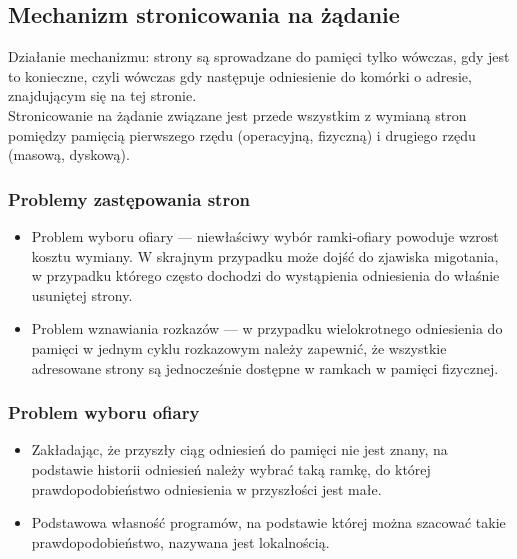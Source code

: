 \documentclass[12pt]{article}
\begin{document}
    \subsection{Mechanizm stronicowania na żądanie}
    Działanie mechanizmu: strony są sprowadzane do pamięci tylko wówczas, gdy jest to konieczne, czyli wówczas gdy następuje
    odniesienie do komórki o adresie, znajdującym się na tej stronie.
    \\
    Stronicowanie na żądanie związane jest przede wszystkim z wymianą stron pomiędzy pamięcią pierwszego rzędu (operacyjną,
    fizyczną) i drugiego rzędu (masową, dyskową).
    
    \subsubsection{Problemy zastępowania stron}
    \begin{itemize}
        \item Problem wyboru ofiary — niewłaściwy wybór ramki-ofiary powoduje wzrost kosztu wymiany. W skrajnym przypadku może dojść do zjawiska migotania, w przypadku którego często dochodzi do wystąpienia odniesienia do
        właśnie usuniętej strony.
        \item Problem wznawiania rozkazów — w przypadku wielokrotnego odniesienia do pamięci w jednym cyklu rozkazowym należy
        zapewnić, że wszystkie adresowane strony są jednocześnie dostępne w ramkach w pamięci fizycznej.
    \end{itemize}
    
    \subsubsection{Problem wyboru ofiary}
    \begin{itemize}
        \item Zakładając, że przyszły ciąg odniesień do pamięci nie jest znany, na podstawie historii odniesień należy wybrać taką ramkę, do której prawdopodobieństwo odniesienia w przyszłości jest małe.
        \item Podstawowa własność programów, na podstawie której można szacować takie prawdopodobieństwo, nazywana jest lokalnością.
    \end{itemize}
    
\end{document}

